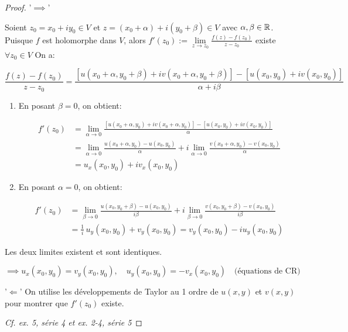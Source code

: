 \begin{proof}{'$\implies$'}\hfill

    Soient $z_0 = x_0 + i y_0 \in V$ et $z = (x_0 + \alpha) + i (y_0 + \beta) \in V$ avec $\alpha, \beta \in \mathbb{R}$.
    Puisque $f$ est holomorphe dans $V$, alors $f'(z_0) := \lim\limits_{z \rightarrow z_0} \frac{f(z) - f(z_0)}{z - z_0}$ existe $\forall z_0 \in V$
    On a:
    
    \[\frac{f(z) - f(z_0)}{z - z_0} = \frac{[u(x_0 + \alpha, y_0 + \beta) + iv(x_0 + \alpha, y_0 + \beta)] - [u(x_0,y_0) + iv(x_0,y_0)]}{\alpha + i\beta}\]
    
    \begin{enumerate}[label=\alph*)]
    \item
    En posant $\beta = 0$, on obtient:
    
    \begin{align*}
    f'(z_0) &= \lim\limits_{\alpha \rightarrow 0} \frac{[u(x_0 + \alpha, y_0) + iv(x_0 + \alpha, y_0)] - [u(x_0,y_0) + iv(x_0,y_0)]}{\alpha}
    \\&=
    \lim\limits_{\alpha \rightarrow 0} \frac{u(x_0 + \alpha, y_0)  - u(x_0,y_0)}{\alpha} + i \lim\limits_{\alpha \rightarrow 0} \frac{v(x_0 + \alpha, y_0) - v(x_0,y_0)}{\alpha}
    \\&=
    u_x(x_0,y_0) + i v_x(x_0,y_0)
    \end{align*}
    
    \item
    En posant $\alpha = 0$, on obtient:
    
    \begin{align*}
    f'(z_0) &= \lim\limits_{\beta \rightarrow 0} \frac{u(x_0, y_0 + \beta) - u(x_0,y_0)}{i\beta} + i \lim\limits_{\beta \rightarrow 0} \frac{v(x_0, y_0 + \beta) - v(x_0,y_0)}{i\beta}
    \\&=
    \frac{1}{i}\, u_y(x_0,y_0) + v_y(x_0,y_0) = v_y(x_0,y_0) - i u_y(x_0,y_0)
    \end{align*}
    \end{enumerate}

    Les deux limites existent et sont identiques.

    \[\implies u_x(x_0,y_0) = v_y(x_0,y_0), \quad u_y(x_0,y_0) = -v_x(x_0,y_0) \quad \textrm{(équations de CR)}\]
    
    '$\Longleftarrow$' \hspace{1em} On utilise les développements de Taylor au 1\ier{} ordre de $u(x,y)$ et $v(x,y)$ pour montrer que $f'(z_0)$ existe.
    
    \textit{Cf. ex. 5, série 4 et ex. 2-4, série 5}
\end{proof}

